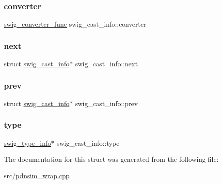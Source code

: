 \subsubsection{\texorpdfstring{converter}{converter}}
{\footnotesize\ttfamily \hyperlink{pdnsim__wrap_8cpp_a9a51597c7c2041da303a65468011f59b}{swig\+\_\+converter\+\_\+func} swig\+\_\+cast\+\_\+info\+::converter}

\mbox{\label{structswig__cast__info_ae79c6fa058a9d908bbdac14db0c9db5e}} 
\subsubsection{\texorpdfstring{next}{next}}
{\footnotesize\ttfamily struct \hyperlink{structswig__cast__info}{swig\+\_\+cast\+\_\+info}$\ast$ swig\+\_\+cast\+\_\+info\+::next}

\mbox{\label{structswig__cast__info_afc685bcf38a5a06c6601775138c5999c}} 
\subsubsection{\texorpdfstring{prev}{prev}}
{\footnotesize\ttfamily struct \hyperlink{structswig__cast__info}{swig\+\_\+cast\+\_\+info}$\ast$ swig\+\_\+cast\+\_\+info\+::prev}

\mbox{\label{structswig__cast__info_a1c9023a301c8d6806209f4e10df6e9e0}} 
\subsubsection{\texorpdfstring{type}{type}}
{\footnotesize\ttfamily \hyperlink{structswig__type__info}{swig\+\_\+type\+\_\+info}$\ast$ swig\+\_\+cast\+\_\+info\+::type}



The documentation for this struct was generated from the following file\+:\begin{DoxyCompactItemize}
\item 
src/\hyperlink{pdnsim__wrap_8cpp}{pdnsim\+\_\+wrap.\+cpp}\end{DoxyCompactItemize}
